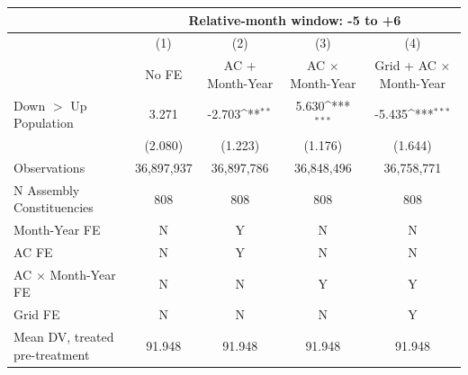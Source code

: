 {
\def\sym#1{\ifmmode^{#1}\else\(^{#1}\)\fi}
\begin{tabular}{l*{4}{c}}
\hline
&\multicolumn{4}{c}{Relative-month window: -5 to +6} \\ \hline
            &\multicolumn{1}{c}{(1)}&\multicolumn{1}{c}{(2)}&\multicolumn{1}{c}{(3)}&\multicolumn{1}{c}{(4)}\\
            &\multicolumn{1}{c}{No FE}&\multicolumn{1}{c}{AC + Month-Year}&\multicolumn{1}{c}{AC $\times$ Month-Year}&\multicolumn{1}{c}{Grid + AC $\times$ Month-Year}\\
\hline
Down $>$ Up Population&       3.271         &      -2.703\sym{**} &       5.630\sym{***}&      -5.435\sym{***}\\
            &     (2.080)         &     (1.223)         &     (1.176)         &     (1.644)         \\
\hline
Observations&  36,897,937         &  36,897,786         &  36,848,496         &  36,758,771         \\
N Assembly Constituencies&         808         &         808         &         808         &         808         \\
Month-Year FE&           N         &           Y         &           N         &           N         \\
AC FE       &           N         &           Y         &           N         &           N         \\
AC $\times$ Month-Year FE&           N         &           N         &           Y         &           Y         \\
Grid FE     &           N         &           N         &           N         &           Y         \\
Mean DV, treated pre-treatment&      91.948         &      91.948         &      91.948         &      91.948         \\
\hline
\end{tabular}
}
